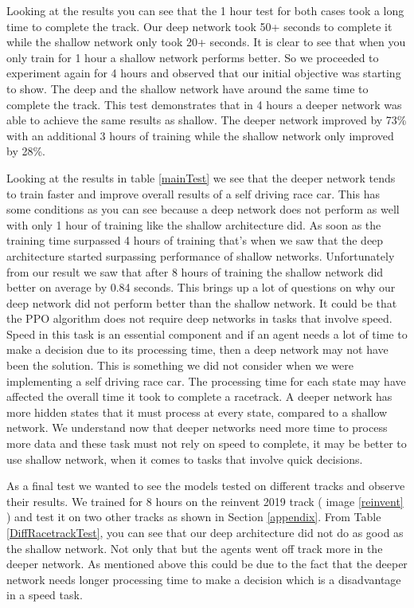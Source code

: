 \documentclass[journal]{IEEEtran}
\begin{document}
Looking at the results you can see that the 1 hour test for both cases took a long time to complete the track.  Our deep network took 50+ seconds to complete it while the shallow network only took 20+ seconds.  It is clear to see that when you only train for 1 hour a shallow network performs better.  So we proceeded to experiment again for 4 hours and observed that our initial objective was starting to show.  The deep and the shallow network have around the same time to complete the track.  This test demonstrates that in 4 hours a deeper network was able to achieve the same results as shallow.  The deeper network improved by 73\% with an additional 3 hours of training while the shallow network only improved by 28\%.  

Looking at the results in table \ref{mainTest} we see that the deeper network tends to train faster and improve overall results of a self driving race car.  This has some conditions as you can see because a deep network does not perform as well with only 1 hour of training like the shallow architecture did.  As soon as the training time surpassed 4 hours of training that's when we saw that the deep architecture started surpassing performance of shallow networks.  Unfortunately from our result we saw that after 8 hours of training the shallow network did better on average by 0.84 seconds.  This brings up a lot of questions on why our deep network did not perform better than the shallow network.  It could be that the PPO algorithm does not require deep networks in tasks that involve speed.  Speed in this task is an essential component and if an agent needs a lot of time to make a decision due to its processing time, then a deep network may not have been the solution.  This is something we did not consider when we were implementing a self driving race car.  The processing time for each state may have affected the overall time it took to complete a racetrack.  A deeper network has more hidden states that it must process at every state, compared to a shallow network.  We understand now that deeper networks need more time to process more data and these task must not rely on speed to complete, it may be better to use shallow network, when it comes to tasks that involve quick decisions.

As a final test we wanted to see the models tested on different tracks and observe their results.  We trained for 8 hours on the reinvent 2019 track ( image \ref{reinvent} ) and test it on two other tracks as shown in Section \ref{appendix}.  From Table \ref{DiffRacetrackTest}, you can see that our deep architecture did not do as good as the shallow network.  Not only that but the agents went off track more in the deeper network.  As mentioned above this could be due to the fact that the deeper network needs longer processing time to make a decision which is a disadvantage in a speed task.
\end{document}
